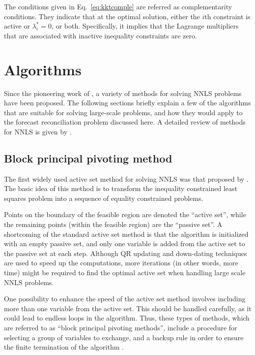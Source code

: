 \documentclass[twocolumn]{svjour3}
\begin{document}
The conditions given in Eq.~\eqref{eq:kktcomple} are referred as complementarity conditions. They indicate that at the optimal solution, either the $i$th constraint is active or $\lambda_{i}^{*} = 0$, or both. Specifically, it implies that the Lagrange multipliers that are associated with inactive inequality constraints are zero.

\section{Algorithms}\label{sec:quadalgo}

Since the pioneering work of \citet{Lawson1974}, a variety of methods for solving NNLS problems have been proposed. The following sections briefly explain a few of the algorithms that are suitable for solving large-scale problems, and how they would apply to the forecast reconciliation problem discussed here. A detailed review of methods for NNLS is given by \citet{Chen2009}.

\subsection{Block principal pivoting method}

The first widely used active set method for solving NNLS was that proposed by \citet{Lawson1974}. The basic idea of this method is to transform the inequality constrained least squares problem into a sequence of equality constrained problems.

Points on the boundary of the feasible region are denoted the ``active set'', while the remaining points (within the feasible region) are the ``passive set''. A shortcoming of the standard active set method is that the algorithm is initialized with an empty passive set, and only one variable is added from the active set to the passive set at each step. Although QR updating and down-dating techniques are used to speed up the computations, more iterations (in other words, more time) might be required to find the optimal active set when handling large scale NNLS problems.

One possibility to enhance the speed of the active set method involves including more than one variable from the active set. This should be handled carefully, as it could lead to endless loops in the algorithm. Thus, these types of methods, which are referred to  as ``block principal pivoting methods'', include a procedure for selecting a group of variables to exchange, and a backup rule in order to ensure the finite termination of the algorithm \citep{Judice1994}.
\end{document}
